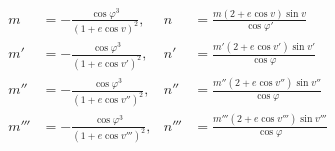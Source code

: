 \[
\begin{aligned}
m&=-\frac{\cos\varphi^3}{(1+e\cos v)^2},&n&=\frac{m(2+e\cos v)\sin v}{\cos\varphi'}\\[6pt]
m'&=-\frac{\cos\varphi^3}{(1+e\cos v')^2},&n'&=\frac{m'(2+e\cos v')\sin v'}{\cos\varphi}\\[6pt]
m''&=-\frac{\cos\varphi^3}{(1+e\cos v'')^2},&n''&=\frac{m''(2+e\cos v'')\sin v''}{\cos\varphi}\\[6pt]
m'''&=-\frac{\cos\varphi^3}{(1+e\cos v''')^2},&n'''&=\frac{m'''(2+e\cos v''')\sin v'''}{\cos\varphi}
\end{aligned}
\]
